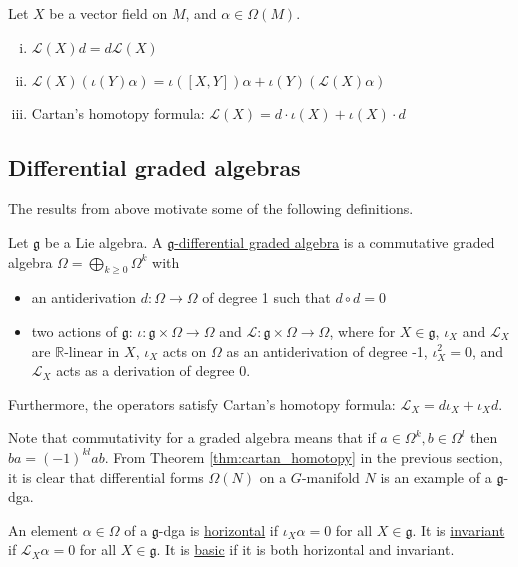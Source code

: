 \begin{thm} \label{thm:cartan_homotopy} %
	Let $X$ be a vector field on  $M$, and $\alpha\in \Omega(M)$. 
	\begin{enumerate}[(i)]
	    \item $\mathcal{L}(X)d = d\mathcal{L}(X)$
		\item $\mathcal{L}(X)(\iota(Y)\alpha) = \iota([X,Y])\alpha +
			\iota(Y)(\mathcal{L}(X)\alpha)$ 
		\item Cartan's homotopy formula: $\mathcal{L}(X) = d
			\cdot\iota(X)+\iota(X)\cdot d$
	\end{enumerate}
\end{thm}


\subsection{Differential graded algebras}
The results from above motivate some of the following definitions.
\begin{defn}
	Let $\mathfrak{g}$ be a Lie algebra. A \underline{$\mathfrak{g}$-differential graded
	algebra} is a commutative graded algebra $\Omega= \bigoplus_{k\geq
	0}\Omega^k$ with 
	\begin{itemize}
		\item an antiderivation $d:\Omega\to\Omega$ of degree 1 such that
	$d\circ d = 0$
		\item two actions of $\mathfrak{g}$: $\iota:\mathfrak{g}\times\Omega\to\Omega$
			and  $\mathcal{L}:\mathfrak{g}\times\Omega\to\Omega$, where for
			$X\in\mathfrak{g}$,  $\iota_X$ and  $\mathcal{L}_X$ are
			$\mathbb{R}$-linear in $X$,  $\iota_X$ acts on  $\Omega$ as an
			antiderivation of degree -1,  $\iota_X^2 = 0$, and  $\mathcal{L}_X$
			acts as a derivation of degree 0.
	\end{itemize}
	Furthermore, the operators satisfy Cartan's homotopy formula:
	$\mathcal{L}_X= d\iota_X+\iota_Xd$.
\end{defn}
Note that commutativity for a graded algebra means that if $a\in
\Omega^k,b\in\Omega^l$ then $ba = (-1)^{kl}ab$. 
From Theorem \ref{thm:cartan_homotopy} in the previous section, it is
clear that differential forms $\Omega(N)$ on a $G$-manifold  $N$ is an example
of a $\mathfrak{g}$-dga. 

\begin{defn}
	An element $\alpha\in\Omega$ of a $\mathfrak{g}$-dga is 
	\underline{horizontal} if $\iota_X\alpha=0$ for all $X\in\mathfrak{g}$. 
	It is \underline{invariant} if $\mathcal{L}_X\alpha = 0$ for all $X\in
	\mathfrak{g}$. It is \underline{basic} if it is both horizontal and
	invariant.
\end{defn}

